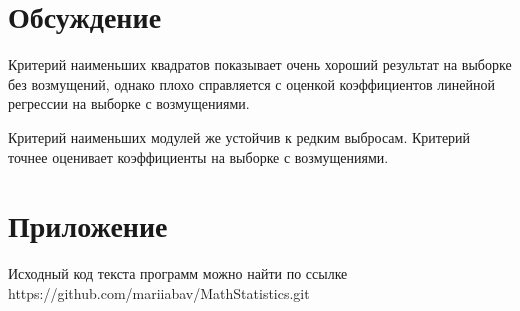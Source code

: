 \section{Обсуждение}
Критерий наименьших квадратов показывает очень хороший результат на выборке без возмущений, однако плохо справляется с оценкой коэффициентов линейной регрессии на выборке с возмущениями. 

Критерий наименьших модулей же устойчив к редким выбросам. Критерий точнее оценивает коэффициенты на выборке с возмущениями.

\section{Приложение}
Исходный код текста программ можно найти по ссылке \\ https://github.com/mariiabav/MathStatistics.git 